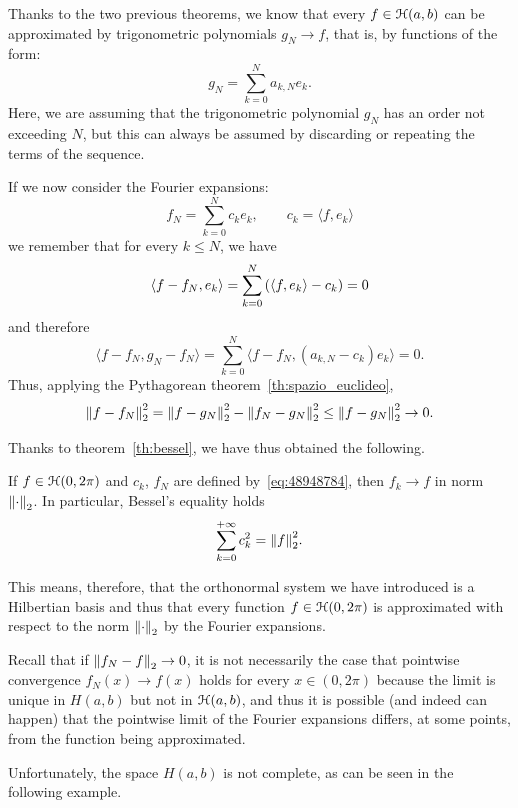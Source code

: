 Thanks to the two previous theorems, we know that every $f\in \mathcal H(a,b)$ can be
approximated by trigonometric polynomials $g_N\to f$, that is, by functions of
the form:
\[
  g_N = \sum_{k=0}^{N} a_{k,N} e_k.
\]
Here, we are assuming that the trigonometric polynomial $g_N$ has an order not
exceeding $N$, but this can always be assumed by discarding or repeating the
terms of the sequence.

If we now consider the Fourier expansions:
\begin{equation}\label{eq:48948784}
  f_N = \sum_{k=0}^N c_k e_k, \qquad c_k = \langle f,e_k\rangle
\end{equation}
we remember that for every $k\le N$, we have
\[
   \langle f-f_N, e_k \rangle
   = \sum_{k=0}^N {\left( \langle f,e_k\rangle - c_k \right)} = 0
\]
and therefore
\[
  \langle f-f_N , g_N -f_N\rangle
  = \sum_{k=0}^N \langle f-f_N, (a_{k,N}-c_k) e_k \rangle
  = 0.
\]
Thus, applying the Pythagorean theorem~\ref{th:spazio_euclideo},
\[
  {\left\Vert f-f_N\right\Vert}_2^2 = {\left\Vert f-g_N\right\Vert}_2^2 - {\left\Vert f_N-g_N\right\Vert}_2^2
  \le {\left\Vert f-g_N\right\Vert}_2^2 \to 0.
\]

Thanks to theorem~\ref{th:bessel}, we have thus obtained the following.
\begin{theorem}
If $f\in \mathcal H(0,2\pi)$ and $c_k$, $f_N$ are defined by~\eqref{eq:48948784}, then
$f_k\to f$ in norm ${\left\Vert \cdot\right\Vert}_2$. In particular, Bessel's equality holds
\begin{equation}\label{eq:uguaglianza_Bessel}
  \sum_{k=0}^{+\infty} c_k^2 = {\left\Vert f\right\Vert}_2^2.
\end{equation}
\end{theorem}


This means, therefore, that the orthonormal system we have introduced is a
Hilbertian basis and thus that every function $f\in \mathcal H(0,2\pi)$ is approximated
with respect to the norm ${\left\Vert \cdot \right\Vert}_2$ by the Fourier expansions.

Recall that if ${\left\Vert f_N-f\right\Vert}_2 \to 0$, it is not necessarily the case that
pointwise convergence $f_N(x)\to f(x)$ holds for every $x\in (0,2\pi)$ because
the limit is unique in $H(a,b)$ but not in $\mathcal H(a,b)$, and thus it is possible
(and indeed can happen) that the pointwise limit of the Fourier expansions
differs, at some points, from the function being approximated.

Unfortunately, the space $H(a,b)$ is not complete, as can be seen in the
following example.

